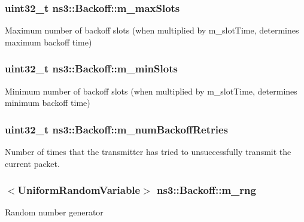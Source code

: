 \subsubsection[{\texorpdfstring{m\+\_\+max\+Slots}{m_maxSlots}}]{\setlength{\rightskip}{0pt plus 5cm}uint32\+\_\+t ns3\+::\+Backoff\+::m\+\_\+max\+Slots}\hypertarget{classns3_1_1Backoff_a53371fae4145bba2abb512cd16156bf6}{}\label{classns3_1_1Backoff_a53371fae4145bba2abb512cd16156bf6}
Maximum number of backoff slots (when multiplied by m\+\_\+slot\+Time, determines maximum backoff time) 
\subsubsection[{\texorpdfstring{m\+\_\+min\+Slots}{m_minSlots}}]{\setlength{\rightskip}{0pt plus 5cm}uint32\+\_\+t ns3\+::\+Backoff\+::m\+\_\+min\+Slots}\hypertarget{classns3_1_1Backoff_a8870f8d30cfe1766d097314af562fc69}{}\label{classns3_1_1Backoff_a8870f8d30cfe1766d097314af562fc69}
Minimum number of backoff slots (when multiplied by m\+\_\+slot\+Time, determines minimum backoff time) 
\subsubsection[{\texorpdfstring{m\+\_\+num\+Backoff\+Retries}{m_numBackoffRetries}}]{\setlength{\rightskip}{0pt plus 5cm}uint32\+\_\+t ns3\+::\+Backoff\+::m\+\_\+num\+Backoff\+Retries\hspace{0.3cm}{\ttfamily [private]}}\hypertarget{classns3_1_1Backoff_a6dbf047af4b1bf7cf2e8c65fb47ae8e3}{}\label{classns3_1_1Backoff_a6dbf047af4b1bf7cf2e8c65fb47ae8e3}
Number of times that the transmitter has tried to unsuccessfully transmit the current packet. 
\subsubsection[{\texorpdfstring{m\+\_\+rng}{m_rng}}]{$<${\bf Uniform\+Random\+Variable}$>$ ns3\+::\+Backoff\+::m\+\_\+rng\hspace{0.3cm}{\ttfamily [private]}}\hypertarget{classns3_1_1Backoff_ace4778afde585215faf4e5a5cc150f2b}{}\label{classns3_1_1Backoff_ace4778afde585215faf4e5a5cc150f2b}
Random number generator 
